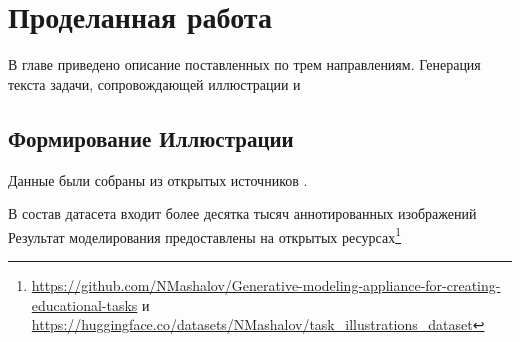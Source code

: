 
\chapter{Проделанная работа}
В главе приведено описание поставленных по трем направлениям. Генерация текста задачи, сопровождающей иллюстрации и  

\section{Формирование Иллюстрации}

Данные были собраны из открытых источников \cite{libmipt}\cite{mathedu}. 


В состав датасета входит более десятка тысяч аннотированных изображений  
Результат моделирования предоставлены 
на открытых ресурсах\footnote{
\url{https://github.com/NMashalov/Generative-modeling-appliance-for-creating-educational-tasks}
и \url{https://huggingface.co/datasets/NMashalov/task_illustrations_dataset}
}
